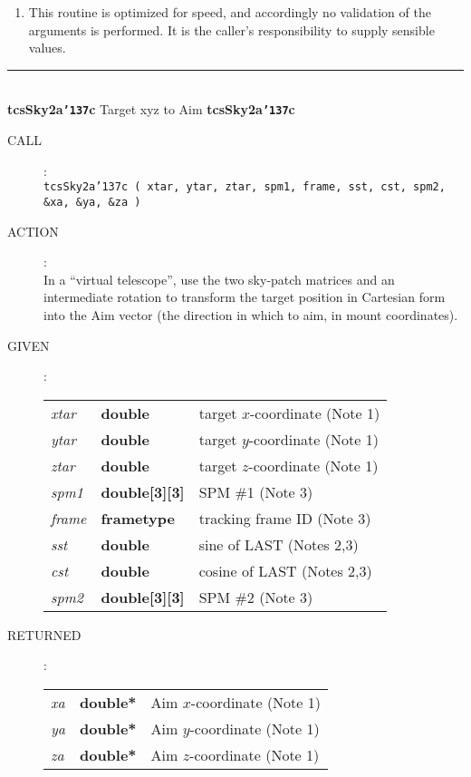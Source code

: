 \documentclass[12pt,fleqn,twoside]{article}
\renewcommand{\_}{{\tt\char'137}}     %
\newcommand{\radec}     {$[\,\alpha,\delta\,]$}
\newcommand{\hadec}     {$[\,h,\delta\,]$}
\newcommand{\azel}      {$[\,Az,El~]$}
\newcommand{\routine}[2]
{
  \newpage
  \rule{\textwidth}{0.3mm}\\ \nopagebreak
  {\Large {\bf #1} \hfill #2 \hfill {\bf #1}}
  \vspace{-1ex}
}
\newcommand{\call}[1]
{
  \goodbreak
  \begin{description}
    \item[CALL]: \\[0.5ex] \nopagebreak
        {\tt #1}
  \end{description}
  \vspace{-3ex}
}
\newcommand{\action}[1]
{
  \goodbreak
  \begin{description}
    \item[ACTION]: \\[0.5ex] \nopagebreak
        #1
  \end{description}
  \vspace{-3ex}
}
\newcommand{\args}[2]
{
  \goodbreak
  \begin{description}
  \item[#1]: \\[1.5ex] \nopagebreak
    \hspace*{-0.9em}
    \begin{tabular}{p{4.5em}p{5.8em}p{23.5em}}
      #2
    \end{tabular}
  \end{description}
  \vspace{-3ex}
}
\newcommand{\spec}[3]
{
  {\em {#1}} & {\bf \mbox{#2}} & {#3}
}
\begin{document}
{\begin{enumerate}
\begin{tabbing}
         \> {\tt spm1   } \> identity matrix \\
         \> {\tt sst,cst} \> \radec\ $\Rightarrow$ \hadec \\
         \> {\tt spm2   } \> topocentric \hadec\ $\Rightarrow$ {\sc Aim}
      \end{tabbing}
      \begin{tabbing}
         xxx \= xxxxxxxxxx \= \kill
         \> {\tt frame  } \> {\tt AZEL\_TOPO} \\
         \> {\tt target } \> topocentric \azel\ (N thru E) \\
         \> {\tt spm1   } \> identity matrix \\
         \> {\tt sst,cst} \> not used \\
         \> {\tt spm2   } \> topocentric \azel\ $\Rightarrow$ {\sc Aim}
      \end{tabbing}

      ICRS $\approx$ FK5 J2000 to better than 25 mas.
\item This routine is optimized for speed, and accordingly no
      validation of the arguments is performed.  It is the caller's
      responsibility to supply sensible values.
\end{enumerate}
}
\routine{tcsSky2a\_c}{Target xyz to {\sc Aim}}
\label{tcsSky2a_c}
\call{tcsSky2a\_c ( xtar, ytar, ztar, spm1, frame, sst, cst, spm2, \\
      \hspace*{6em} \&xa, \&ya, \&za ) }
\action{In a ``virtual telescope'', use the two sky-patch matrices and an
        intermediate rotation to transform the target position in Cartesian
        form into the {\sc Aim} vector (the direction in
        which to aim, in mount coordinates).}
\args{GIVEN}
{
\spec{xtar}{double}{target $x$-coordinate (Note 1)} \\
\spec{ytar}{double}{target $y$-coordinate (Note 1)} \\
\spec{ztar}{double}{target $z$-coordinate (Note 1)} \\
\spec{spm1}{double[3][3]}{SPM \#1 (Note 3)} \\
\spec{frame}{{\sc frametype}}{tracking frame ID (Note 3)} \\
\spec{sst}{double}{sine of LAST (Notes 2,3)} \\
\spec{cst}{double}{cosine of LAST (Notes 2,3)} \\
\spec{spm2}{double[3][3]}{SPM \#2 (Note 3)}
}
\args{RETURNED}
{
\spec{xa}{double*}{{\sc Aim} $x$-coordinate (Note 1)} \\
\spec{ya}{double*}{{\sc Aim} $y$-coordinate (Note 1)} \\
\spec{za}{double*}{{\sc Aim} $z$-coordinate (Note 1)}
}
\end{document}
